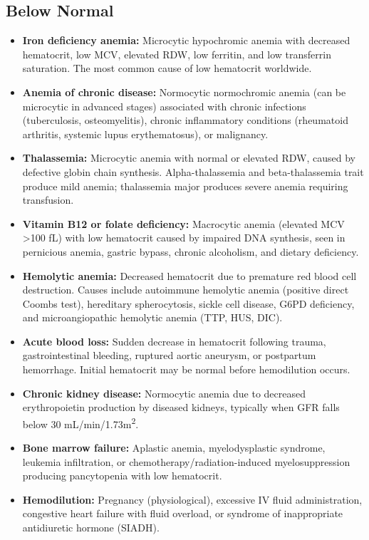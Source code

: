 \subsection*{Below Normal}
\begin{itemize}
  \item \textbf{Iron deficiency anemia:} Microcytic hypochromic anemia with decreased hematocrit, low MCV, elevated RDW, low ferritin, and low transferrin saturation. The most common cause of low hematocrit worldwide.
  \item \textbf{Anemia of chronic disease:} Normocytic normochromic anemia (can be microcytic in advanced stages) associated with chronic infections (tuberculosis, osteomyelitis), chronic inflammatory conditions (rheumatoid arthritis, systemic lupus erythematosus), or malignancy.
  \item \textbf{Thalassemia:} Microcytic anemia with normal or elevated RDW, caused by defective globin chain synthesis. Alpha-thalassemia and beta-thalassemia trait produce mild anemia; thalassemia major produces severe anemia requiring transfusion.
  \item \textbf{Vitamin B12 or folate deficiency:} Macrocytic anemia (elevated MCV >100 fL) with low hematocrit caused by impaired DNA synthesis, seen in pernicious anemia, gastric bypass, chronic alcoholism, and dietary deficiency.
  \item \textbf{Hemolytic anemia:} Decreased hematocrit due to premature red blood cell destruction. Causes include autoimmune hemolytic anemia (positive direct Coombs test), hereditary spherocytosis, sickle cell disease, G6PD deficiency, and microangiopathic hemolytic anemia (TTP, HUS, DIC).
  \item \textbf{Acute blood loss:} Sudden decrease in hematocrit following trauma, gastrointestinal bleeding, ruptured aortic aneurysm, or postpartum hemorrhage. Initial hematocrit may be normal before hemodilution occurs.
  \item \textbf{Chronic kidney disease:} Normocytic anemia due to decreased erythropoietin production by diseased kidneys, typically when GFR falls below 30 mL/min/1.73m\textsuperscript{2}.
  \item \textbf{Bone marrow failure:} Aplastic anemia, myelodysplastic syndrome, leukemia infiltration, or chemotherapy/radiation-induced myelosuppression producing pancytopenia with low hematocrit.
  \item \textbf{Hemodilution:} Pregnancy (physiological), excessive IV fluid administration, congestive heart failure with fluid overload, or syndrome of inappropriate antidiuretic hormone (SIADH).
\end{itemize}

